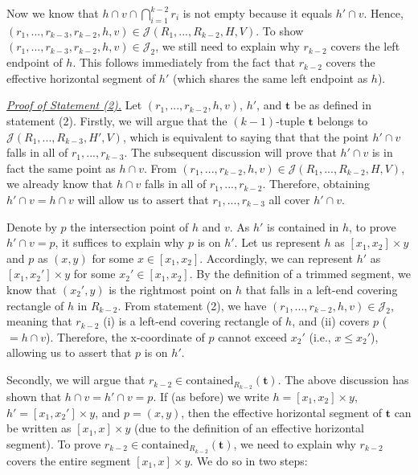 \documentclass[acmsmall,review,anonymous]{acmart}
\def\vgap{\vspace{1mm}}
\def\extraspacing{\vspace{2mm} \noindent}
\def\J{\mathcal{J}}
\def\contained{\mathrm{contained}}
\begin{document}
{{{\vgap

Now we know that $h \cap v \cap \bigcap_{i = 1}^{k-2} r_i$ is not empty because it equals $h' \cap v$. Hence,
$(r_1,...,r_{k-3}, r_{k-2}, h, v) \in \J(R_1,...,R_{k-2},H,V)$. To show $(r_1,...,r_{k-3}, r_{k-2}, h, v) \in \J_2$, we still need to explain why $r_{k-2}$ covers the left endpoint of $h$. This follows immediately from the fact that $r_{k-2}$ covers the effective horizontal segment of $h'$ (which shares the same left endpoint as $h$).

\extraspacing \underline{\em Proof of Statement (2).} Let $(r_1,...,r_{k-2},h,v)$, $h'$, and $\bm{t}$ be as defined in statement (2). Firstly, we will argue that the $(k-1)$-tuple $\bm{t}$ belongs to $\J(R_1,...,R_{k-3}, H', V)$, which is equivalent to saying that that the point $h' \cap v$ falls in all of $r_1,...,r_{k-3}$. The subsequent discussion will prove that $h' \cap v$ is in fact the same point as $h \cap v$. From $(r_1,...,r_{k-2},h,v) \in \J(R_1,...,R_{k-2},H,V)$, we already know that $h \cap v$ falls in all of $r_1,...,r_{k-2}$. Therefore, obtaining $h' \cap v = h \cap v$ will allow us to assert that $r_1,...,r_{k-3}$ all cover $h' \cap v$.

\vgap

Denote by $p$ the intersection point of $h$ and $v$. As $h'$ is contained in $h$, to prove $h' \cap v = p$, it suffices to explain why $p$ is on $h'$. Let us represent $h$ as $[x_1,x_2] \times y$ and $p$ as $(x, y)$ for some $x \in [x_1, x_2]$. Accordingly, we can represent $h'$ as $[x_1, x_2'] \times y$ for some $x_2' \in [x_1, x_2]$. By the definition of a trimmed segment, we know that $(x_2',y)$ is the rightmost point on $h$ that falls in a left-end covering rectangle of $h$ in $R_{k-2}$. From statement (2), we have $(r_1,...,r_{k-2},h,v) \in \J_2$, meaning that $r_{k-2}$ (i) is a left-end covering rectangle of $h$, and (ii) covers $p$ ($= h \cap v$). Therefore, the x-coordinate of $p$ cannot exceed $x_2'$ (i.e., $x \le x_2'$), allowing us to assert that $p$ is on $h'$.

\vgap


Secondly, we will argue that $r_{k-2}\in \contained_{R_{k-2}}(\bm{t})$. The above discussion has shown that $h \cap v = h' \cap v = p$. If (as before) we write $h = [x_1,x_2] \times y$, $h' = [x_1,x_2'] \times y$, and $p = (x,y)$, then the effective horizontal segment of $\bm{t}$ can be written as $[x_1, x] \times y$ (due to the definition of an effective horizontal segment). To prove $r_{k-2} \in \contained_{R_{k-2}}(\bm{t})$, we need to explain why $r_{k-2}$ covers the entire segment $[x_1, x] \times y$. We do so in two steps:

}}}
\end{document}
